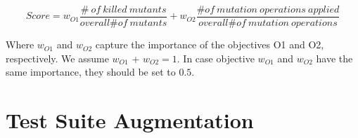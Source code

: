 \begin{equation}
Score=w_{O1} \frac{\# \ \mathit{of}\ \mathit{killed} \ \mathit{mutants}}{\mathit{overall} \# \mathit{of}\ \mathit{mutants}} + w_{O2} \frac{\# \mathit{of}\ \mathit{mutation} \ \mathit{operations} \ \mathit{applied}}{\mathit{overall} \# \mathit{of}\ \mathit{mutation} \ \mathit{operations}}
\label{f:mutation:score}
\end{equation}

Where $w_{O1}$ and $w_{O2}$ capture the importance of the objectives O1 and O2, respectively. We assume $w_{O1}$ + $w_{O2} = 1$. In case objective $w_{O1}$ and $w_{O2}$ have the same importance, they should be set to $0.5$. 










\clearpage
\section{Test Suite Augmentation} %
\label{sec:data:test_suite_augmentation}


